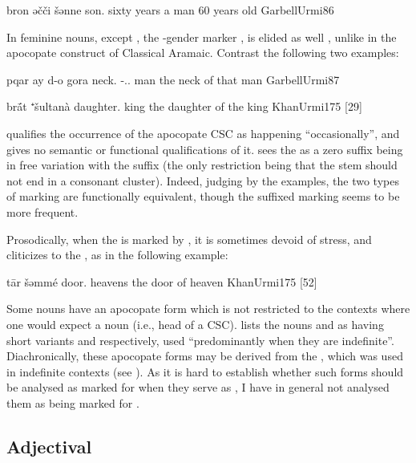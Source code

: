 {bron əčči šənne}
{son.\cst{} sixty years}
{a man 60 years old}
{GarbellUrmi}{86}	


In feminine nouns, except , the \fem*-gender marker , is elided as well \citep[55]{GarbellUrmi}, unlike in the apocopate construct of Classical Aramaic. Contrast the following two examples:

{pqar ay d-o gora}
{neck.\cst{} \lnk{} \gen-\dem.\far.\masc{} man}
{the neck of that man}
{GarbellUrmi}{87} 

{brā́t ⁺šultanà}
{daughter.\cst{} king}
{the daughter of the king}
{KhanUrmi}{175 {[29]}}


\citet[175]{KhanUrmi} qualifies the occurrence of the apocopate CSC as happening \enquote{occasionally}, and gives no semantic or functional qualifications of it. \citet[55]{GarbellUrmi} sees the  as a zero suffix being in free variation with the \ed suffix (the only restriction being that the stem should not end in a consonant cluster). Indeed, judging by the examples, the two types of marking are functionally equivalent, though the suffixed marking seems to be more frequent.

Prosodically, when the \prim is marked by , it is sometimes devoid of stress, and cliticizes to the \secn, as in the following example: 

{tār\cb{} šəmmé}
{door.\cst\cb{} heavens}
{the door of heaven}
{KhanUrmi}{175 {[52]}}

\newpage 
Some nouns have an apocopate form which is not restricted to the contexts where one would expect a  noun (i.e., head of a CSC). \citet[161]{KhanUrmi} lists the nouns  and  as having short variants  and  respectively, used \enquote{predominantly when they are indefinite}. Diachronically, these apocopate forms may be derived from the , which was used in indefinite contexts (see ).
 As it is hard to establish whether such forms should be analysed as marked for \cst* when they serve as \prims, I have in general not analysed them as being marked for \cst*.

\subsection{Adjectival \prims} 

